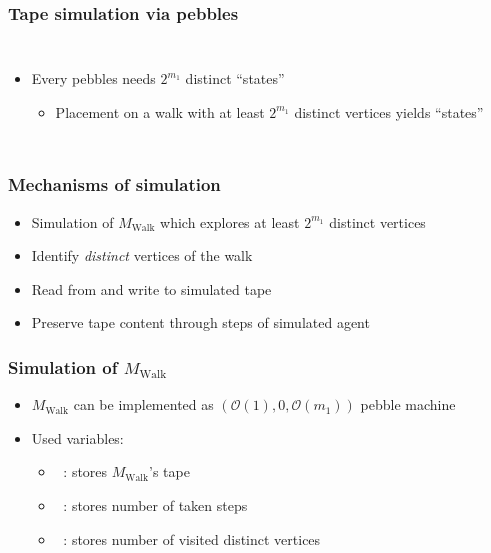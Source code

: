 \documentclass{beamer}
\DeclareMathOperator{\Tid}{T_{\text{id}}}
\DeclareMathOperator{\Tsteps}{T_{\text{steps}}}
\DeclareMathOperator{\Twalk}{T_{\text{walk}}}
\begin{document}
\begin{frame}
  \frametitle{Tape simulation via pebbles}
  
  \begin{columns}
    \begin{itemize}
      \item Every pebbles needs $2^{m_{1}}$ distinct \enquote{states}
        \begin{itemize}
          \item Placement on a walk with at least $2^{m_{1}}$ distinct vertices
            yields \enquote{states}
        \end{itemize}
    \end{itemize}
    \resizebox{\textwidth}{!}{}
  \end{columns}
\end{frame}

\begin{frame}
  \frametitle{Mechanisms of simulation}
  \begin{itemize}
    \item Simulation of $M_{\text{Walk}}$ which explores at least $2^{m_{1}}$
      distinct vertices
    \item Identify \emph{distinct} vertices of the walk
    \item Read from and write to simulated tape
    \item Preserve tape content through steps of simulated agent
  \end{itemize}
\end{frame}

\begin{frame}
  \frametitle{Simulation of $M_{\text{Walk}}$}
  \begin{itemize}
    \item $M_{\text{Walk}}$ can be implemented as
      $(\mathcal{O}(1), 0, \mathcal{O}(m_{1}))$ pebble machine
    \item Used variables:
      \begin{itemize}
        \item $\Twalk$: stores $M_{\text{Walk}}$'s tape
        \item $\Tsteps$: stores number of taken steps
        \item $\Tid$: stores number of visited distinct vertices
      \end{itemize}
  \end{itemize}
\end{frame}
\end{document}
